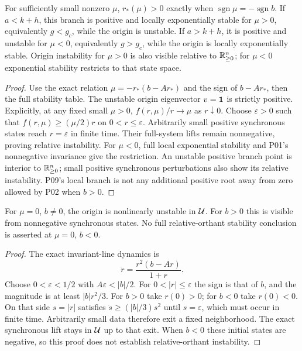 \begin{corollary}
\label{cor:P09-physical}
For sufficiently small nonzero $\mu$, $r_*(\mu)>0$ exactly when
$\operatorname{sgn}\mu=-\operatorname{sgn}b$.
If $a<k+h$, this branch is positive and locally exponentially stable
for $\mu>0$, equivalently $g<g_c$, while the origin is unstable.
If $a>k+h$, it is positive and unstable for $\mu<0$, equivalently
$g>g_c$, while the origin is locally exponentially stable.
Origin instability for $\mu>0$ is also visible relative to $\mathbb{R}_{\geq 0}^{n}$;
for $\mu<0$ exponential stability restricts to that state space.
\end{corollary}
\begin{proof}
Use the exact relation $\mu=-r_*(b-Ar_*)$ and the sign of $b-Ar_*$,
then the full stability table. The unstable origin eigenvector
$v=\mathbf{1}$ is strictly positive. Explicitly, at any fixed small $\mu>0$,
$f(r,\mu)/r\to\mu$ as $r\downarrow0$. Choose $\varepsilon>0$ such
that $f(r,\mu)\ge(\mu/2)r$ on $0<r\le\varepsilon$.
Arbitrarily small positive synchronous states reach $r=\varepsilon$
in finite time. Their full-system lifts remain nonnegative, proving
relative instability. For $\mu<0$, full local exponential stability
and P01's nonnegative invariance give the restriction. An unstable
positive branch point is interior to $\mathbb{R}_{\geq 0}^{n}$; small positive synchronous
perturbations also show its relative instability. P09's local branch
is not any additional positive root away from zero allowed by P02
when $b>0$.
\end{proof}

\begin{proposition}
\label{prop:P09-generic-critical}
For $\mu=0$, $b\ne0$, the origin is nonlinearly unstable in $\mathcal{U}$.
For $b>0$ this is visible from nonnegative synchronous states.
No full relative-orthant stability conclusion is asserted at
$\mu=0$, $b<0$.
\end{proposition}
\begin{proof}
The exact invariant-line dynamics is
\begin{equation}
 \dot r=\frac{r^2(b-Ar)}{1+r}.\label{eq:P09-generic-critical}
\end{equation}
Choose $0<\varepsilon<1/2$ with $A\varepsilon<|b|/2$.
For $0<|r|\le\varepsilon$ the sign is that of $b$, and the magnitude
is at least $|b|r^2/3$. For $b>0$ take $r(0)>0$; for $b<0$ take
$r(0)<0$. On that side $s=|r|$ satisfies
$\dot s\ge(|b|/3)s^2$ until $s=\varepsilon$, which must occur in
finite time. Arbitrarily small data therefore exit a fixed neighborhood.
The exact synchronous lift stays in $\mathcal{U}$ up to that exit.
When $b<0$ these initial states are negative, so this proof does not
establish relative-orthant instability.
\end{proof}

